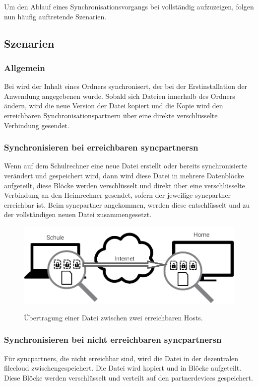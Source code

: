 Um den Ablauf eines Synchronisationsvorgangs bei \sblit vollständig aufzuzeigen,
folgen nun häufig auftretende Szenarien.

\subsection{Szenarien}
\subsubsection{Allgemein}
Bei \sblit wird der Inhalt eines Ordners synchronisert, der bei der
Erstinstallation der Anwendung angegebenen wurde. Sobald sich Dateien innerhalb des Ordners
ändern, wird die neue Version der Datei kopiert und die Kopie wird den
erreichbaren Synchronisationspartnern über eine direkte verschlüsselte Verbindung
gesendet.

\subsubsection{Synchronisieren bei erreichbaren \glspl{syncpartner}n}
Wenn auf dem Schulrechner eine neue Datei erstellt oder bereits synchronisierte verändert und
gespeichert wird, dann wird diese Datei in mehrere Datenblöcke
aufgeteilt, diese Blöcke werden verschlüsselt und direkt über eine verschlüsselte
Verbindung an den Heimrechner gesendet, sofern der jeweilige \gls{syncpartner}
erreichbar ist. Beim \gls{syncpartner} angekommen, werden diese
entschlüsselt und zu der vollständigen neuen Datei zusammengesetzt.

\begin{figure}[H]
	\centering
  \includegraphics[]{images/sblit_p2p}
	\label{sblit_p2p}
  \caption{Übertragung einer Datei zwischen zwei erreichbaren Hosts.}
\end{figure}

\subsubsection{Synchronisieren bei nicht erreichbaren \glspl{syncpartner}n}
Für \glspl{syncpartner}, die nicht erreichbar sind, wird die Datei in der dezentralen
\gls{filecloud} zwischengespeichert. Die Datei wird kopiert und in Blöcke
aufgeteilt. Diese Blöcke werden verschlüsselt und verteilt auf den
\glspl{partnerdevice} gespeichert.

